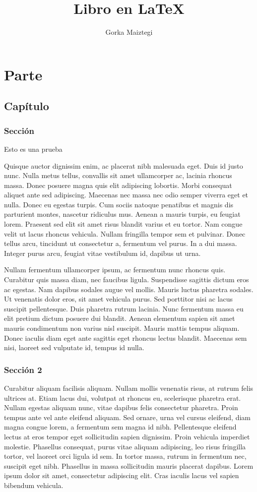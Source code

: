 \documentclass{ritsi/book}
\title{Libro en \LaTeX}
\author{Gorka Maiztegi}
\begin{document}
\part{Parte}

\chapter{Capítulo}

\section{Sección}

Esto es una prueba

Quisque auctor dignissim enim, ac placerat nibh malesuada eget. Duis id justo nunc. Nulla metus tellus, convallis sit amet ullamcorper ac, lacinia rhoncus massa. Donec posuere magna quis elit adipiscing lobortis. Morbi consequat aliquet ante sed adipiscing. Maecenas nec massa nec odio semper viverra eget et nulla. Donec eu egestas turpis. Cum sociis natoque penatibus et magnis dis parturient montes, nascetur ridiculus mus. Aenean a mauris turpis, eu feugiat lorem. Praesent sed elit sit amet risus blandit varius et eu tortor. Nam congue velit ut lacus rhoncus vehicula. Nullam fringilla tempor sem et pulvinar. Donec tellus arcu, tincidunt ut consectetur a, fermentum vel purus. In a dui massa. Integer purus arcu, feugiat vitae vestibulum id, dapibus ut urna. 

Nullam fermentum ullamcorper ipsum, ac fermentum nunc rhoncus quis. Curabitur quis massa diam, nec faucibus ligula. Suspendisse sagittis dictum eros ac egestas. Nam dapibus sodales augue vel mollis. Mauris luctus pharetra sodales. Ut venenatis dolor eros, sit amet vehicula purus. Sed porttitor nisi ac lacus suscipit pellentesque. Duis pharetra rutrum lacinia. Nunc fermentum massa eu elit pretium dictum posuere dui blandit. Aenean elementum sapien sit amet mauris condimentum non varius nisl suscipit. Mauris mattis tempus aliquam. Donec iaculis diam eget ante sagittis eget rhoncus lectus blandit. Maecenas sem nisi, laoreet sed vulputate id, tempus id nulla. 

\section{Sección 2}

Curabitur aliquam facilisis aliquam. Nullam mollis venenatis risus, at rutrum felis ultrices at. Etiam lacus dui, volutpat at rhoncus eu, scelerisque pharetra erat. Nullam egestas aliquam nunc, vitae dapibus felis consectetur pharetra. Proin tempus ante vel ante eleifend aliquam. Sed ornare, urna vel cursus eleifend, diam magna congue lorem, a fermentum sem magna id nibh. Pellentesque eleifend lectus at eros tempor eget sollicitudin sapien dignissim. Proin vehicula imperdiet molestie. Phasellus consequat, purus vitae aliquam adipiscing, leo risus fringilla tortor, vel laoreet orci ligula id sem. In tortor massa, rutrum in fermentum nec, suscipit eget nibh. Phasellus in massa sollicitudin mauris placerat dapibus. Lorem ipsum dolor sit amet, consectetur adipiscing elit. Cras iaculis lacus vel sapien bibendum vehicula. 
\end{document}
